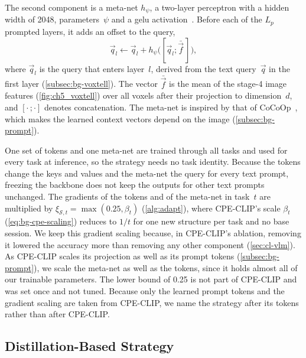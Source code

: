 The second component is a meta-net $h_\psi$, a two-layer perceptron with a hidden width of 2048, parameters~$\psi$ and a \gls{gelu} activation~\cite{hendrycks2016gelu}.
Before each of the $L_p$ prompted layers, it adds an offset to the query,
\begin{equation}
\vec{q}_l \leftarrow \vec{q}_l + h_\psi\big([\vec{q}_l; \bar{\vec{f}}\,]\big),
\label{eq:method-metanet}
\end{equation}
where $\vec{q}_l$ is the query that enters layer~$l$, derived from the text query~$\vec{q}$ in the first layer (\cref{subsec:bg-voxtell}).
The vector $\bar{\vec{f}}$ is the mean of the stage-4 image features (\cref{fig:ch5_voxtell}) over all voxels after their projection to dimension~$d$, and $[\cdot\,;\cdot]$ denotes concatenation.
The meta-net is inspired by that of CoCoOp~\cite{zhou2022cocoop}, which makes the learned context vectors depend on the image (\cref{subsec:bg-prompt}).

One set of tokens and one meta-net are trained through all tasks and used for every task at inference, so the strategy needs no task identity.
Because the tokens change the keys and values and the meta-net the query for every text prompt, freezing the backbone does not keep the outputs for other text prompts unchanged.
The gradients of the tokens and of the meta-net in task~$t$ are multiplied by $\xi_{\mathcal{S},t} = \max(0.25, \beta_t)$ (\cref{alg:adapt}), where CPE-CLIP's scale $\beta_t$ (\cref{eq:bg-cpe-scaling}) reduces to $1/t$ for one new structure per task and no base session.
We keep this gradient scaling because, in CPE-CLIP's ablation, removing it lowered the accuracy more than removing any other component (\cref{sec:cl-vlm}).
As CPE-CLIP scales its projection as well as its prompt tokens (\cref{subsec:bg-prompt}), we scale the meta-net as well as the tokens, since it holds almost all of our trainable parameters.
The lower bound of 0.25 is not part of CPE-CLIP and was set once and not tuned.
Because only the learned prompt tokens and the gradient scaling are taken from CPE-CLIP, we name the strategy after its tokens rather than after CPE-CLIP.

\subsection{Distillation-Based Strategy}
\label{subsec:method-distillation}

